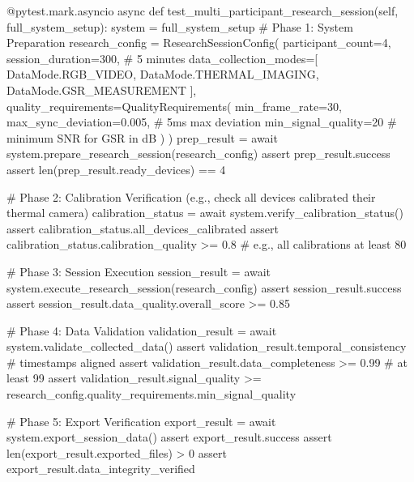 \documentclass[11pt,a4paper]{report}
\begin{document}
        @pytest.mark.asyncio
        async def test\_multi\_participant\_research\_session(self, full\_system\_setup):
            system = full\_system\_setup
            # Phase 1: System Preparation
            research\_config = ResearchSessionConfig(
                participant\_count=4,
                session\_duration=300,  # 5 minutes
                data\_collection\_modes=[
                    DataMode.RGB\_VIDEO,
                    DataMode.THERMAL\_IMAGING,
                    DataMode.GSR\_MEASUREMENT
                ],
                quality\_requirements=QualityRequirements(
                    min\_frame\_rate=30,
                    max\_sync\_deviation=0.005,  # 5ms max deviation
                    min\_signal\_quality=20      # minimum SNR for GSR in dB
                )
            )
            prep\_result = await system.prepare\_research\_session(research\_config)
            assert prep\_result.success
            assert len(prep\_result.ready\_devices) == 4

            # Phase 2: Calibration Verification (e.g., check all devices calibrated their thermal camera)
            calibration\_status = await system.verify\_calibration\_status()
            assert calibration\_status.all\_devices\_calibrated
            assert calibration\_status.calibration\_quality >= 0.8  # e.g., all calibrations at least 80%

            # Phase 3: Session Execution
            session\_result = await system.execute\_research\_session(research\_config)
            assert session\_result.success
            assert session\_result.data\_quality.overall\_score >= 0.85

            # Phase 4: Data Validation
            validation\_result = await system.validate\_collected\_data()
            assert validation\_result.temporal\_consistency  # timestamps aligned
            assert validation\_result.data\_completeness >= 0.99  # at least 99%
            assert validation\_result.signal\_quality >= research\_config.quality\_requirements.min\_signal\_quality

            # Phase 5: Export Verification
            export\_result = await system.export\_session\_data()
            assert export\_result.success
            assert len(export\_result.exported\_files) > 0
            assert export\_result.data\_integrity\_verified
\end{document}
